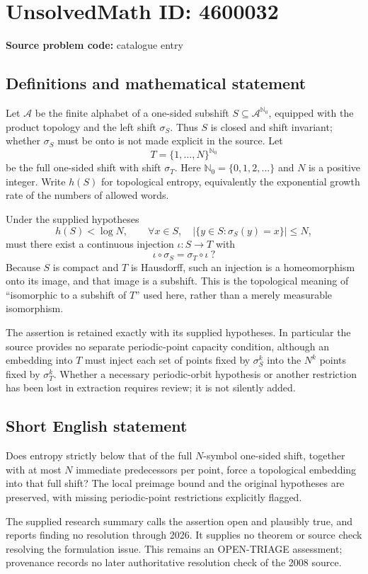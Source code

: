 \documentclass[11pt]{article}
\newcommand{\N}{\mathbb{N}}
\begin{document}
\section*{UnsolvedMath ID: 4600032}
\textbf{Source problem code:} catalogue entry
\subsection{Definitions and mathematical statement}
Let $\mathcal A$ be the finite alphabet of a one-sided subshift $S\subseteq\mathcal A^{\N_0}$, equipped with the product topology and the left shift $\sigma_S$. Thus $S$ is closed and shift invariant; whether $\sigma_S$ must be onto is not made explicit in the source. Let
\[
 T=\{1,\ldots,N\}^{\N_0}
\]
be the full one-sided shift with shift $\sigma_T$. Here $\N_0=\{0,1,2,\ldots\}$ and $N$ is a positive integer. Write $h(S)$ for topological entropy, equivalently the exponential growth rate of the numbers of allowed words.

Under the supplied hypotheses
\[
 h(S)<\log N,\qquad
 \forall x\in S,\quad
 |\{y\in S:\sigma_S(y)=x\}|\le N,
\]
must there exist a continuous injection $\iota:S\to T$ with
\[
 \iota\circ\sigma_S=\sigma_T\circ\iota\ ?
\]
Because $S$ is compact and $T$ is Hausdorff, such an injection is a homeomorphism onto its image, and that image is a subshift. This is the topological meaning of ``isomorphic to a subshift of $T$'' used here, rather than a merely measurable isomorphism.

The assertion is retained exactly with its supplied hypotheses. In particular the source provides no separate periodic-point capacity condition, although an embedding into $T$ must inject each set of points fixed by $\sigma_S^k$ into the $N^k$ points fixed by $\sigma_T^k$. Whether a necessary periodic-orbit hypothesis or another restriction has been lost in extraction requires review; it is not silently added.
\subsection{Short English statement}
Does entropy strictly below that of the full $N$-symbol one-sided shift, together with at most $N$ immediate predecessors per point, force a topological embedding into that full shift? The local preimage bound and the original hypotheses are preserved, with missing periodic-point restrictions explicitly flagged.

The supplied research summary calls the assertion open and plausibly true, and reports finding no resolution through 2026. It supplies no theorem or source check resolving the formulation issue. This remains an OPEN-TRIAGE assessment; provenance records no later authoritative resolution check of the 2008 source.
\end{document}

